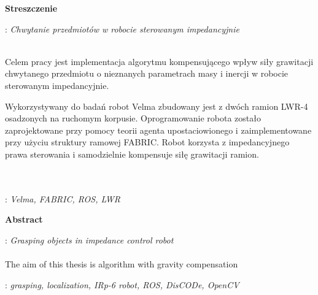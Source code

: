 


\clearpage\mbox{}\thispagestyle{empty}\newpage




%

\clearpage\mbox{}\newpage



\vspace*{\baselineskip}
\begin{center}
	{\large\bfseries Streszczenie}\par\bigskip
\end{center}
: {\itshape Chwytanie przedmiotów w robocie sterowanym impedancyjnie}
\\\\
{
	Celem pracy jest implementacja algorytmu kompensującego wpływ siły grawitacji chwytanego przedmiotu o nieznanych parametrach masy i inercji w robocie sterowanym impedancyjnie.
	
	Wykorzystywany do badań robot Velma zbudowany jest z dwóch ramion LWR-4 osadzonych na ruchomym korpusie. Oprogramowanie robota zostało zaprojektowane przy pomocy teorii agenta upostaciowionego i zaimplementowane przy użyciu struktury ramowej FABRIC. Robot korzysta z impedancyjnego prawa sterowania i samodzielnie kompensuje siłę grawitacji ramion. 
}\\\\
\vspace*{0.6\baselineskip}
: {\itshape Velma, FABRIC, ROS, LWR}

\clearpage\mbox{}\newpage


\vspace*{\baselineskip}
\begin{center}
	{\large\bfseries Abstract}\par\bigskip
\end{center}
: {\itshape Grasping objects in impedance control robot}
\\\\
{ 
	The aim of this thesis is algorithm with gravity compensation 
}\par
\vspace*{1\baselineskip}
: {\itshape grasping, localization, IRp-6 robot, ROS, DisCODe, OpenCV}

\clearpage\mbox{}\newpage



\clearpage\mbox{}\newpage




